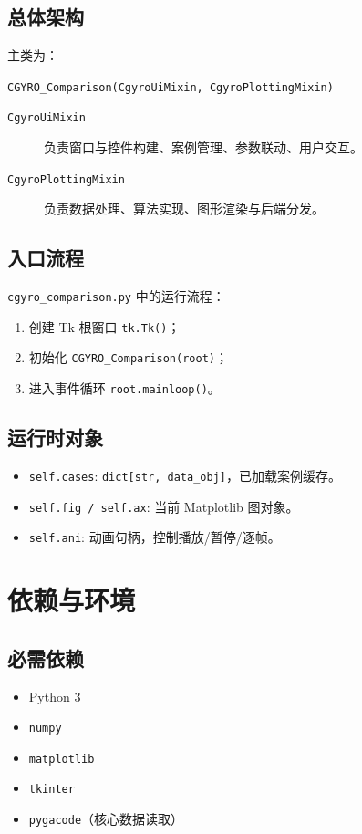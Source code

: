 \documentclass[11pt,a4paper]{ctexart}
\begin{document}
\subsection{总体架构}
主类为：
\begin{center}
\texttt{CGYRO\_Comparison(CgyroUiMixin, CgyroPlottingMixin)}
\end{center}

\begin{description}
  \item[\texttt{CgyroUiMixin}] 负责窗口与控件构建、案例管理、参数联动、用户交互。
  \item[\texttt{CgyroPlottingMixin}] 负责数据处理、算法实现、图形渲染与后端分发。
\end{description}

\subsection{入口流程}
\texttt{cgyro\_comparison.py} 中的运行流程：
\begin{enumerate}
  \item 创建 Tk 根窗口 \texttt{tk.Tk()}；
  \item 初始化 \texttt{CGYRO\_Comparison(root)}；
  \item 进入事件循环 \texttt{root.mainloop()}。
\end{enumerate}

\subsection{运行时对象}
\begin{itemize}
  \item \texttt{self.cases}: \texttt{dict[str, data\_obj]}，已加载案例缓存。
  \item \texttt{self.fig / self.ax}: 当前 Matplotlib 图对象。
  \item \texttt{self.ani}: 动画句柄，控制播放/暂停/逐帧。
\end{itemize}

\section{依赖与环境}
\subsection{必需依赖}
\begin{itemize}
  \item Python 3
  \item \texttt{numpy}
  \item \texttt{matplotlib}
  \item \texttt{tkinter}
  \item \texttt{pygacode}（核心数据读取）
\end{itemize}
\end{document}

